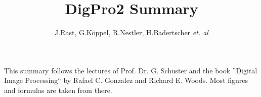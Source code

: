 \documentclass{scrartcl}
\title{DigPro2 Summary}
\author{J.Rast, G.Köppel, R.Nestler, H.Badertscher \textit{et. al}}
\begin{document}

\lstset{language=Matlab}

\begin{titlepage}
	\maketitle
	\vfill
	\hspace{2cm}
	\begin{minipage}{0.6\linewidth}
		This summary follows the lectures of Prof. Dr. G. Schuster and the book 
		''Digital Image Processing`` by Rafael C. Gonzalez and Richard E. Woods. Most
		figures and formulas are taken from there.	
	\end{minipage}	
\end{titlepage}

\setcounter{tocdepth}{2}
\tableofcontents
\newpage

\setcounter{section}{8}




%
\end{document}
